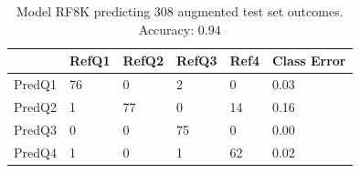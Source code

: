 
\begin{table}[H]
  \centering
  \caption{Model RF8K predicting 308 augmented test set
    outcomes. Accuracy: $0.94$}
  \label{tab:rf8KConf300}
  \begin{tabular}{@{}llllll@{}}
    \toprule
           & RefQ1  & RefQ2  & RefQ3  & Ref4  & Class Error \\ \midrule
    PredQ1 & 76      & 0       & 2       & 0       & 0.03        \\
    PredQ2 & 1       & 77      & 0       & 14      & 0.16        \\
    PredQ3 & 0       & 0       & 75      & 0       & 0.00        \\
    PredQ4 & 1       & 0       & 1       & 62      & 0.02        \\ \bottomrule
  \end{tabular}
\end{table}


